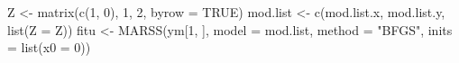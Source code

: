 \begin{Schunk}
\begin{Sinput}
 Z <- matrix(c(1, 0), 1, 2, byrow = TRUE)
 mod.list <- c(mod.list.x, mod.list.y, list(Z = Z))
 fitu <- MARSS(ym[1, ], model = mod.list, method = "BFGS", inits = list(x0 = 0))
\end{Sinput}
\end{Schunk}
